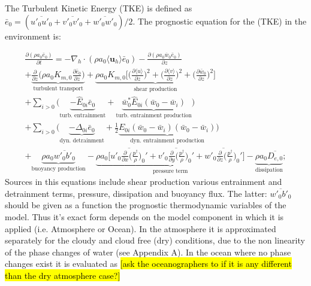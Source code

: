 \documentclass{report}
\begin{document}
The Turbulent Kinetic Energy (TKE) is defined as $\bar{e}_0 = (\overline{u'_0 u'_0} + \overline{v'_0 v'_0} + \overline{w'_0 w'_0})/2$. The prognostic equation for the (TKE) in the environment is:

\begin{multline}
\frac{\partial (\rho a_0 \bar{e}_0)}{\partial t} =
- \nabla_h \cdot (\rho a_0 \langle \mathbf{u}_h \rangle \bar{e}_0) - \frac{\partial (\rho a_0 \overline{w}_0 \bar{e}_0)}{\partial z}\\
+ \underbrace{ \frac{\partial}{\partial z}\Bigg(\rho a_0 K_{m,0} \frac{\partial\bar{e}_0}{\partial z} \Bigg)}_{\text{turbulent transport}} +
\underbrace{\rho a_0 K_{m,0} \Bigg[ \Bigg(\frac{\partial \langle u \rangle}{\partial z}\Bigg)^2 + \Bigg(\frac{\partial \langle v \rangle}{\partial z}\Bigg)^2 + \Bigg(\frac{\partial \bar{w}_0}{\partial z}\Bigg)^2\Bigg]}_{\text{shear production}} \\
+\sum_{i>0}{\Big(\underbrace{-\hat{E}_{0i} \bar{e}_0}_{\text{turb. entrainment}} + \underbrace{\bar{w}^*_0\hat{E}_{0i}(\bar{w}_0-\bar{w}_i)}_{\text{turb. entrainment production}}} \Big) \\ 
+ \sum_{i>0}{\Big(\underbrace{- \Delta_{0i} \bar{e}_0}_{\text{dyn. detrainment}} 
+ \frac{1}{2}\underbrace{E_{0i} (\bar{w}_0 -\bar{w}_i) (\bar{w}_0 -\bar{w}_i)}_{\text{dyn. entrainment production}}} \Big) \\
+ \underbrace{\rho a_0\overline{w'_0 b'_0}}_{\text{buoyancy production}} - \underbrace{\rho a_0\Bigg[\overline{u'_0\frac{\partial }{\partial x}\Bigg( \frac{p^\dagger}{\rho}\Bigg)_0'} + \overline{v'_0\frac{\partial}{\partial y} \Bigg( \frac{p^\dagger}{\rho}\Bigg)_0'}+ \overline{w'_0\frac{\partial}{\partial z} \Bigg( \frac{p^\dagger}{\rho}\Bigg)_0'}  \Bigg] }_{\text{pressure term}} - \underbrace{ \rho a_0 \overline{D_{e, 0}}}_{\text{dissipation}};
\label{eq:tke_equation} 
\end{multline}
Sources in this equations include shear production various entrainment and detrainment terms, pressure, dissipation and buoyancy flux. The latter: $\overline{w'_0 b'_0}$ should be given as a function the prognostic thermodynamic variables of the model. Thus it's exact form depends on the model component in which it is applied (i.e. Atmosphere or Ocean). In the atmosphere it is approximated separately for the cloudy and cloud free (dry) conditions, due to the non linearity of the phase changes of water (see Appendix A). In the ocean where no phase changes exist it is evaluated as \hl{[ask the oceanographers to if it is any different than the dry atmosphere case?]}
\end{document}
